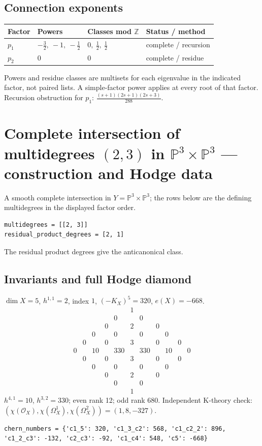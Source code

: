 \documentclass[10pt,a4paper]{article}
\begin{document}
\subsection*{Connection exponents}
\begin{center}\begin{tabular}{llll}\toprule Factor & Powers & Classes mod $\mathbb Z$ & Status / method\\\midrule
$p_{1}$ & $- \frac{3}{2},\ -1,\ - \frac{1}{2}$ & $0,\ \frac{1}{2},\ \frac{1}{2}$ & complete / recursion\\
$p_{2}$ & $0$ & $0$ & complete / residue\\
\bottomrule\end{tabular}\end{center}
Powers and residue classes are multisets for each eigenvalue in the indicated factor, not paired lists. A simple-factor power applies at every root of that factor.
Recursion obstruction for $p_{1}$: $\frac{\left(s + 1\right) \left(2 s + 1\right) \left(2 s + 3\right)}{288}$.
\clearpage\section*{Complete intersection of multidegrees $(2,3)$ in $\mathbb P^{3}\times \mathbb P^{3}$ --- construction and Hodge data}\label{entry:PROD5-B02}
A smooth complete intersection in $Y=\mathbb P^{3}\times\mathbb P^{3}$; the rows below are the defining multidegrees in the displayed factor order.
\begin{lstlisting}
multidegrees = [[2, 3]]
residual_product_degrees = [2, 1]
\end{lstlisting}
The residual product degrees give the anticanonical class.
\subsection*{Invariants and full Hodge diamond}
$\dim X=5$, $h^{1,1}=2$, index $1$, $(-K_X)^5=320$, $e(X)=-668$.
\[\begin{array}{ccccccccccc}&&&&&1&&&&&\\&&&&0&&0&&&&\\&&&0&&2&&0&&&\\&&0&&0&&0&&0&&\\&0&&0&&3&&0&&0&\\0&&10&&330&&330&&10&&0\\&0&&0&&3&&0&&0&\\&&0&&0&&0&&0&&\\&&&0&&2&&0&&&\\&&&&0&&0&&&&\\&&&&&1&&&&&\end{array}\]
$h^{4,1}=10$, $h^{3,2}=330$; even rank 12; odd rank 680.
Independent K-theory check: $(\chi(\mathcal O_X),\chi(\Omega_X^1),\chi(\Omega_X^2))=(1, 8, -327)$.
\begin{lstlisting}
chern_numbers = {'c1_5': 320, 'c1_3_c2': 568, 'c1_c2_2': 896, 'c1_2_c3': -132, 'c2_c3': -92, 'c1_c4': 548, 'c5': -668}
\end{lstlisting}
\end{document}
